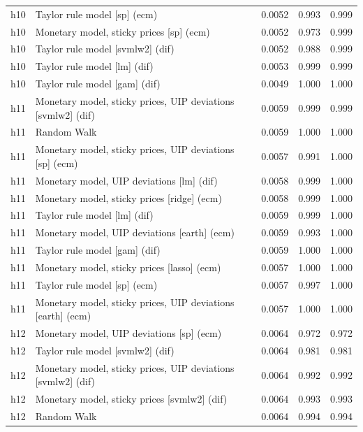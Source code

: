 \begin{ThreePartTable}
\begin{longtable}[t]{cp{5.5cm}ccc}
h10 & \raggedright Taylor rule model [sp] (ecm) & 0.0052 & 0.993 & 0.999\\
h10 & \raggedright Monetary model, sticky prices [sp] (ecm) & 0.0052 & 0.973 & 0.999\\
h10 & \raggedright Taylor rule model [svmlw2] (dif) & 0.0052 & 0.988 & 0.999\\
h10 & \raggedright Taylor rule model [lm] (dif) & 0.0053 & 0.999 & 0.999\\
h10 & \raggedright Taylor rule model [gam] (dif) & 0.0049 & 1.000 & 1.000\\
\addlinespace
h11 & \raggedright Monetary model, sticky prices, UIP deviations [svmlw2] (dif) & 0.0059 & 0.999 & 0.999\\
h11 & \raggedright Random Walk & 0.0059 & 1.000 & 1.000\\
h11 & \raggedright Monetary model, sticky prices, UIP deviations [sp] (ecm) & 0.0057 & 0.991 & 1.000\\
h11 & \raggedright Monetary model, UIP deviations [lm] (dif) & 0.0058 & 0.999 & 1.000\\
h11 & \raggedright Monetary model, sticky prices [ridge] (ecm) & 0.0058 & 0.999 & 1.000\\
h11 & \raggedright Taylor rule model [lm] (dif) & 0.0059 & 0.999 & 1.000\\
h11 & \raggedright Monetary model, UIP deviations [earth] (ecm) & 0.0059 & 0.993 & 1.000\\
h11 & \raggedright Taylor rule model [gam] (dif) & 0.0059 & 1.000 & 1.000\\
h11 & \raggedright Monetary model, sticky prices [lasso] (ecm) & 0.0057 & 1.000 & 1.000\\
h11 & \raggedright Taylor rule model [sp] (ecm) & 0.0057 & 0.997 & 1.000\\
h11 & \raggedright Monetary model, sticky prices, UIP deviations [earth] (ecm) & 0.0057 & 1.000 & 1.000\\
\addlinespace
h12 & \raggedright Monetary model, UIP deviations [sp] (ecm) & 0.0064 & 0.972 & 0.972\\
h12 & \raggedright Taylor rule model [svmlw2] (dif) & 0.0064 & 0.981 & 0.981\\
h12 & \raggedright Monetary model, sticky prices, UIP deviations [svmlw2] (dif) & 0.0064 & 0.992 & 0.992\\
h12 & \raggedright Monetary model, sticky prices [svmlw2] (dif) & 0.0064 & 0.993 & 0.993\\
h12 & \raggedright Random Walk & 0.0064 & 0.994 & 0.994\\

\end{longtable}
\end{ThreePartTable}
